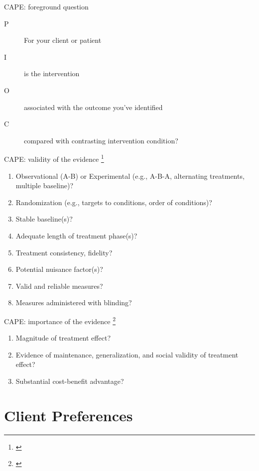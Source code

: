 \documentclass{beamer}
\begin{document}
% 
\begin{frame}{CAPE: foreground question}
	\begin{description}
	\item[P] For \alert{your client or patient}
	\item[I] is \alert{the intervention}
	\item[O] associated with \alert{the outcome you've identified}
	\item[C] compared with \alert{contrasting intervention condition}?
	\end{description} 
\end{frame}

% 
\begin{frame}{CAPE: validity of the evidence \footnote{\tiny{\citet[p. 116]{Dollaghan2007a}}}}
	\begin{enumerate}
	\item Observational (A-B) or Experimental (e.g., A-B-A, alternating treatments, multiple baseline)?
	\item Randomization (e.g., targets to conditions, order of conditions)?
	\item Stable baseline(s)?
	\item Adequate length of treatment phase(s)?
	\item Treatment consistency, fidelity?
	\item Potential nuisance factor(s)?
	\item Valid and reliable measures?
	\item Measures administered with blinding?
	\end{enumerate}
\end{frame}

% 
\begin{frame}{CAPE: importance of the evidence \footnote{\tiny{\citet[p. 116]{Dollaghan2007a}}}}
	\begin{enumerate}
	\item Magnitude of treatment effect?
	\item Evidence of maintenance, generalization, and social validity of treatment effect?
	\item Substantial cost-benefit advantage?
	\end{enumerate}
\end{frame}

\section{Client Preferences}
\end{document}
